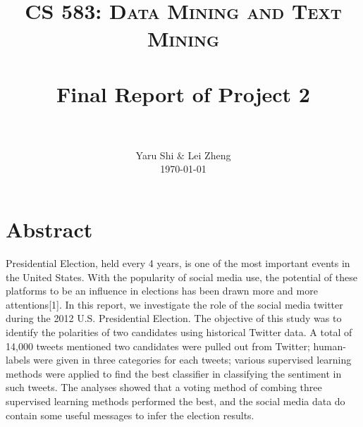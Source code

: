 \documentclass[paper=a4, fontsize=12pt]{scrartcl}
\title{
		\usefont{OT1}{bch}{b}{n}
		\normalfont \normalsize \textsc{CS 583: Data Mining and Text Mining} \\ [10pt]
		\horrule{0.5pt} \\[0.4cm]
		\huge Final Report of Project 2 \\
		\horrule{2pt} \\[0.5cm]
}
\author{
		\normalfont 								\normalsize
        Yaru Shi $\&$ Lei Zheng\\[-3pt]		\normalsize
        \today
}
\date{}
\numberwithin{equation}{section}
\numberwithin{figure}{section}
\numberwithin{table}{section}
\begin{document}
\maketitle
\section{Abstract}
\singlespacing
Presidential Election, held every 4 years, is one of the most important events in the United States. With the popularity of social media use, the potential of these platforms to be an influence in elections has been drawn more and more attentions[1]. In this report, we investigate the role of the social media twitter during the 2012 U.S. Presidential Election. The objective of this study was to identify the polarities of two candidates using historical Twitter data. A total of 14,000 tweets mentioned two candidates were pulled out from Twitter; human-labels were given in three categories for each tweets; various supervised learning methods were applied to find the best classifier in classifying the sentiment in such tweets. The analyses showed that a voting method of combing three supervised learning methods performed the best, and the social media data do contain some useful messages to infer the election results.
\end{document}
